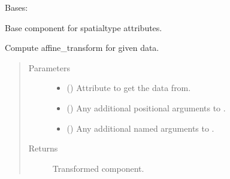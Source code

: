 \documentclass[letterpaper,10pt,english]{sphinxmanual}
\begin{document}
\begin{fulllineitems}
\label{\detokenize{api/base_classes:geology.src.base_spatial.SpatialComponent}}
Bases: {\hyperref[\detokenize{api/base_classes:geology.src.base_component.BaseComponent}]{}}

Base component for spatial\sphinxhyphen{}type attributes.

\begin{fulllineitems}
\label{\detokenize{api/base_classes:geology.src.base_spatial.SpatialComponent.affine_transform}}
Compute affine\_transform for given data.
\begin{quote}\begin{description}
\item[{Parameters}] \leavevmode\begin{itemize}
\item {} 
 (\sphinxstyleliteralemphasis{\sphinxupquote{, }}) \textendash{} Attribute to get the data from.

\item {} 
 () \textendash{} Any additional positional arguments to .

\item {} 
 () \textendash{} Any additional named arguments to .

\end{itemize}

\item[{Returns}] \leavevmode
{} \textendash{} Transformed component.


\end{description}
\end{quote}
\end{fulllineitems}
\end{fulllineitems}
\end{document}
